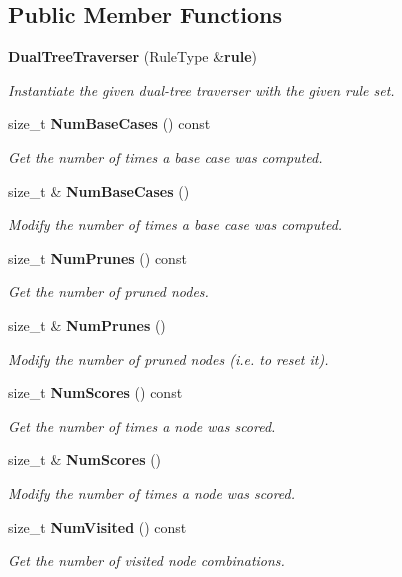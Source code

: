 \subsection*{Public Member Functions}
\begin{DoxyCompactItemize}
\item 
{\bf Dual\+Tree\+Traverser} (Rule\+Type \&{\bf rule})
\begin{DoxyCompactList}\small\item\em Instantiate the given dual-\/tree traverser with the given rule set. \end{DoxyCompactList}\item 
size\+\_\+t {\bf Num\+Base\+Cases} () const 
\begin{DoxyCompactList}\small\item\em Get the number of times a base case was computed. \end{DoxyCompactList}\item 
size\+\_\+t \& {\bf Num\+Base\+Cases} ()
\begin{DoxyCompactList}\small\item\em Modify the number of times a base case was computed. \end{DoxyCompactList}\item 
size\+\_\+t {\bf Num\+Prunes} () const 
\begin{DoxyCompactList}\small\item\em Get the number of pruned nodes. \end{DoxyCompactList}\item 
size\+\_\+t \& {\bf Num\+Prunes} ()
\begin{DoxyCompactList}\small\item\em Modify the number of pruned nodes (i.\+e. to reset it). \end{DoxyCompactList}\item 
size\+\_\+t {\bf Num\+Scores} () const 
\begin{DoxyCompactList}\small\item\em Get the number of times a node was scored. \end{DoxyCompactList}\item 
size\+\_\+t \& {\bf Num\+Scores} ()
\begin{DoxyCompactList}\small\item\em Modify the number of times a node was scored. \end{DoxyCompactList}\item 
size\+\_\+t {\bf Num\+Visited} () const 
\begin{DoxyCompactList}\small\item\em Get the number of visited node combinations. \end{DoxyCompactList}\item 

\end{DoxyCompactItemize}
